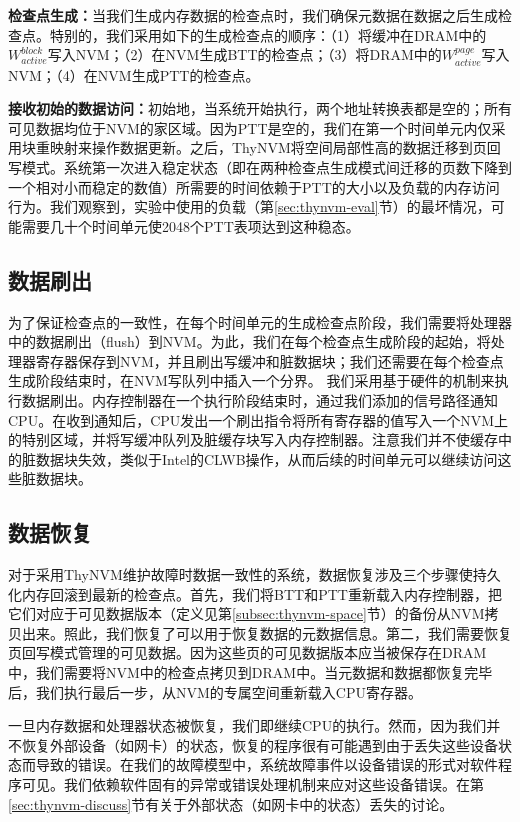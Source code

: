 \textbf{检查点生成：}当我们生成内存数据的检查点时，我们确保元数据在数据之后生成检查点。特别的，我们采用如下的生成检查点的顺序：（1）将缓冲在DRAM中的$W^{block}_{active}$写入NVM；（2）在NVM生成BTT的检查点；（3）将DRAM中的$W^{page}_{active}$写入NVM；（4）在NVM生成PTT的检查点。

\textbf{接收初始的数据访问：}初始地，当系统开始执行，两个地址转换表都是空的；所有可见数据均位于NVM的家区域。因为PTT是空的，我们在第一个时间单元内仅采用块重映射来操作数据更新。之后，ThyNVM将空间局部性高的数据迁移到页回写模式。系统第一次进入稳定状态（即在两种检查点生成模式间迁移的页数下降到一个相对小而稳定的数值）所需要的时间依赖于PTT的大小以及负载的内存访问行为。我们观察到，实验中使用的负载（第\ref{sec:thynvm-eval}节）的最坏情况，可能需要几十个时间单元使2048个PTT表项达到这种稳态。

\subsection{数据刷出}

为了保证检查点的一致性，在每个时间单元的生成检查点阶段，我们需要将处理器中的数据刷出（flush）到NVM。为此，我们在每个检查点生成阶段的起始，将处理器寄存器保存到NVM，并且刷出写缓冲和脏数据块；我们还需要在每个检查点生成阶段结束时，在NVM写队列中插入一个分界。 
我们采用基于硬件的机制来执行数据刷出。内存控制器在一个执行阶段结束时，通过我们添加的信号路径通知CPU。在收到通知后，CPU发出一个刷出指令将所有寄存器的值写入一个NVM上的特别区域，并将写缓冲队列及脏缓存块写入内存控制器。注意我们并不使缓存中的脏数据块失效，类似于Intel的CLWB操作，从而后续的时间单元可以继续访问这些脏数据块。

\subsection{数据恢复} 
对于采用ThyNVM维护故障时数据一致性的系统，数据恢复涉及三个步骤使持久化内存回滚到最新的检查点。首先，我们将BTT和PTT重新载入内存控制器，把它们对应于可见数据版本（定义见第\ref{subsec:thynvm-space}节）的备份从NVM拷贝出来。照此，我们恢复了可以用于恢复数据的元数据信息。第二，我们需要恢复页回写模式管理的可见数据。因为这些页的可见数据版本应当被保存在DRAM中，我们需要将NVM中的检查点拷贝到DRAM中。当元数据和数据都恢复完毕后，我们执行最后一步，从NVM的专属空间重新载入CPU寄存器。 

一旦内存数据和处理器状态被恢复，我们即继续CPU的执行。然而，因为我们并不恢复外部设备（如网卡）的状态，恢复的程序很有可能遇到由于丢失这些设备状态而导致的错误。在我们的故障模型中，系统故障事件以设备错误的形式对软件程序可见。我们依赖软件固有的异常或错误处理机制来应对这些设备错误。在第\ref{sec:thynvm-discuss}节有关于外部状态（如网卡中的状态）丢失的讨论。 

